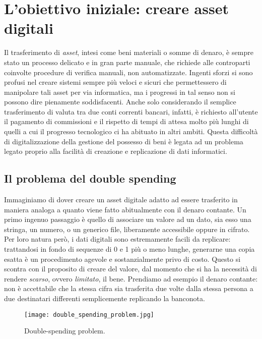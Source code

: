 \section{L'obiettivo iniziale: creare asset digitali}
	Il trasferimento di \emph{asset}, intesi come beni materiali o somme di denaro, è sempre stato un processo delicato e in gran parte manuale, che richiede alle controparti coinvolte procedure di verifica manuali, non automatizzate. Ingenti sforzi si sono profusi nel creare sistemi sempre più veloci e sicuri che permettessero di manipolare tali asset per via informatica, ma i progressi in tal senso non si possono dire pienamente soddisfacenti. Anche solo considerando il semplice trasferimento di valuta tra due conti correnti bancari, infatti, è richiesto all'utente il pagamento di commissioni e il rispetto di tempi di attesa molto più lunghi di quelli a cui il progresso tecnologico ci ha abituato in altri ambiti. Questa difficoltà di digitalizzazione della gestione del possesso di beni è legata ad un problema legato proprio alla facilità di creazione e replicazione di dati informatici.
	\subsection{Il problema del double spending}
		Immaginiamo di dover creare un asset digitale adatto ad essere trasferito in maniera analoga a quanto viene fatto abitualmente con il denaro contante. Un primo ingenuo passaggio è quello di associare un valore ad un dato, sia esso una stringa, un numero, o un generico file, liberamente accessibile oppure in cifrato. Per loro natura però, i dati digitali sono estremamente facili da replicare: trattandosi in fondo di sequenze di 0 e 1 più o meno lunghe, generarne una copia esatta è un procedimento agevole e sostanzialmente privo di costo. Questo si scontra con il proposito di creare del valore, dal momento che si ha la necessità di rendere \emph{scarso}, ovvero \emph{limitato}, il bene. Prendiamo ad esempio il denaro contante: non è accettabile che la stessa cifra sia trasferita due volte dalla stessa persona a due destinatari differenti semplicemente replicando la banconota.
		\begin{figure}[ht]
			\centering
			\texttt{[image: double\_spending\_problem.jpg]}
			\caption[Double-spending problem]{Double-spending problem. \cite{understanding_bitcoin}}
			\label{fig:double-spending_img}
		\end{figure}

